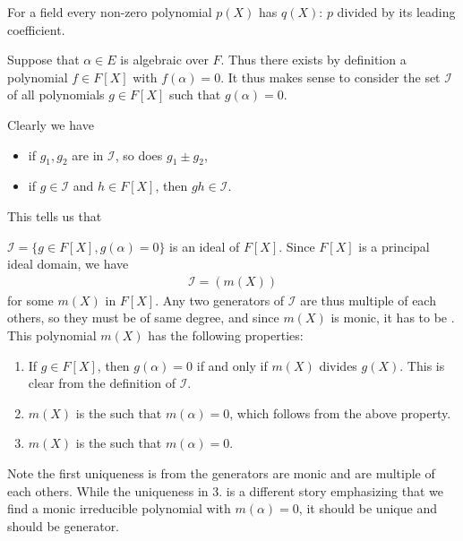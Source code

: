 \documentclass{article}
\begin{document}
\begin{lema}\label{lem:oqemadz}
 For a field every non-zero polynomial $p(X)$ has  $q(X)$: $p$ divided by its leading coefficient.
\end{lema}

Suppose that $\alpha \in E$ is algebraic over $F$. Thus there exists by definition a polynomial $f \in F[X]$ with $f(\alpha)=0$. It thus makes sense to consider the set $\mathcal{I}$ of all polynomials $g \in F[X]$ such that $g(\alpha)=0$.

Clearly we have 
\begin{itemize}
    \item if $g_{1}, g_{2}$ are in $\mathcal{I}$, so does $g_{1} \pm g_{2}$,
    \item if $g \in \mathcal{I}$ and $h \in F[X]$, then $g h \in \mathcal{I}$.
\end{itemize}
This tells us that 
\begin{lema}\label{lem:andagzcc}
 $\mathcal{I}=\{g \in F[X], g(\alpha)=0\}$ is an ideal of $F[X]$. Since $F[X]$ is a principal ideal domain, we have
\begin{align*}
\mathcal{I}=(m(X))
\end{align*}
for some  $m(X)$ in $F[X]$. Any two generators of $\mathcal{I}$ are thus multiple of each others, so they must be of same degree, and since $m(X)$ is monic, it has to be . This  polynomial $m(X)$ has the following properties:
\begin{enumerate}
    \item  If $g \in F[X]$, then $g(\alpha)=0$ if and only if $m(X)$ divides $g(X)$. This is clear from the definition of $\mathcal{I}$.
    \item $m(X)$ is the  such that $m(\alpha)=0$, which follows from the above property.
    \item $m(X)$ is the  such that $m(\alpha)=0$. 
\end{enumerate}
\end{lema}
\begin{remx}
Note the first uniqueness is from the generators are monic and are  multiple of each others. While the uniqueness in 3. is a different story emphasizing  that  we find a monic irreducible polynomial with $m(\alpha)=0$, it should be unique and should be  generator.
\end{remx}
\end{document}
